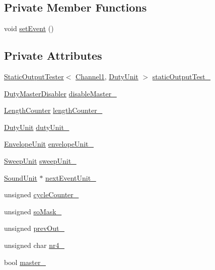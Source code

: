 \subsection*{Private Member Functions}
\begin{DoxyCompactItemize}
\item 
void \hyperlink{classgambatte_1_1Channel1_a64fe824b3762fc41959765870518ae00}{set\+Event} ()
\end{DoxyCompactItemize}
\subsection*{Private Attributes}
\begin{DoxyCompactItemize}
\item 
\hyperlink{classgambatte_1_1StaticOutputTester}{Static\+Output\+Tester}$<$ \hyperlink{classgambatte_1_1Channel1}{Channel1}, \hyperlink{classgambatte_1_1DutyUnit}{Duty\+Unit} $>$ \hyperlink{classgambatte_1_1Channel1_ad2a8bb48b34e55b0441785d90ef2de44}{static\+Output\+Test\+\_\+}
\item 
\hyperlink{classgambatte_1_1DutyMasterDisabler}{Duty\+Master\+Disabler} \hyperlink{classgambatte_1_1Channel1_a7a5413ffc80912d4b3919ee9f9558ae9}{disable\+Master\+\_\+}
\item 
\hyperlink{classgambatte_1_1LengthCounter}{Length\+Counter} \hyperlink{classgambatte_1_1Channel1_a778388a95455d724e60d8a967ca6e4d0}{length\+Counter\+\_\+}
\item 
\hyperlink{classgambatte_1_1DutyUnit}{Duty\+Unit} \hyperlink{classgambatte_1_1Channel1_a9a175d5fdcff89f37d8082a37c2a5a75}{duty\+Unit\+\_\+}
\item 
\hyperlink{classgambatte_1_1EnvelopeUnit}{Envelope\+Unit} \hyperlink{classgambatte_1_1Channel1_a3d38d1f11268440dc3af7a048bf5884c}{envelope\+Unit\+\_\+}
\item 
\hyperlink{classgambatte_1_1Channel1_1_1SweepUnit}{Sweep\+Unit} \hyperlink{classgambatte_1_1Channel1_a897acd11661bcfed391947afd5fc3443}{sweep\+Unit\+\_\+}
\item 
\hyperlink{classgambatte_1_1SoundUnit}{Sound\+Unit} $\ast$ \hyperlink{classgambatte_1_1Channel1_aea999f5a312106cc989ee58546675e8b}{next\+Event\+Unit\+\_\+}
\item 
unsigned \hyperlink{classgambatte_1_1Channel1_aab0807b9a067aa4e93a5e103241d60cc}{cycle\+Counter\+\_\+}
\item 
unsigned \hyperlink{classgambatte_1_1Channel1_a7cee0dbdf0287b6a474ad10bf43918a1}{so\+Mask\+\_\+}
\item 
unsigned \hyperlink{classgambatte_1_1Channel1_a337d3fa9640fc3636c958a1deb4a52f8}{prev\+Out\+\_\+}
\item 
unsigned char \hyperlink{classgambatte_1_1Channel1_a1bcfa7f41bfc210dce49fd7bd5493de4}{nr4\+\_\+}
\item 
bool \hyperlink{classgambatte_1_1Channel1_a7a64d3265bbaac73b734104371ec3207}{master\+\_\+}
\end{DoxyCompactItemize}
